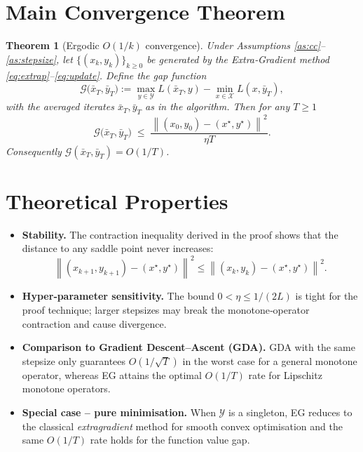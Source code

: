 \documentclass{article}
\newtheorem{theorem}{Theorem}
\newcommand{\norm}[1]{\left\|#1\right\|}
\begin{document}
\section*{Main Convergence Theorem}
\begin{theorem}[Ergodic $O(1/k)$ convergence]\label{thm:main}
Under Assumptions \ref{as:cc}–\ref{as:stepsize}, let $\{(x_k,y_k)\}_{k\ge0}$ be generated by the Extra‑Gradient method \eqref{eq:extrap}–\eqref{eq:update}. Define the \emph{gap function}
\[
\mathcal{G}\bigl(\bar x_T,\bar y_T\bigr):=
\max_{y\in\mathcal{Y}} L(\bar x_T,y)-\min_{x\in\mathcal{X}} L(x,\bar y_T),
\]
with the averaged iterates $\bar x_T,\bar y_T$ as in the algorithm. Then for any $T\ge1$
\[
\mathcal{G}\bigl(\bar x_T,\bar y_T\bigr)\;\le\;
\frac{\norm{(x_0,y_0)-(x^\star,y^\star)}^2}{\eta T}.
\]
Consequently $\mathcal{G}(\bar x_T,\bar y_T)=O(1/T)$.
\end{theorem}

\section*{Theoretical Properties}
\begin{itemize}[noitemsep,topsep=0pt]
\item \textbf{Stability.} The contraction inequality derived in the proof shows that the distance to any saddle point never increases:
\[
\norm{(x_{k+1},y_{k+1})-(x^\star,y^\star)}^2
\le \norm{(x_k,y_k)-(x^\star,y^\star)}^2.
\]
\item \textbf{Hyper‑parameter sensitivity.} The bound $0<\eta\le 1/(2L)$ is tight for the proof technique; larger stepsizes may break the monotone‑operator contraction and cause divergence.
\item \textbf{Comparison to Gradient Descent–Ascent (GDA).} GDA with the same stepsize only guarantees $O(1/\sqrt{T})$ in the worst case for a general monotone operator, whereas EG attains the optimal $O(1/T)$ rate for Lipschitz monotone operators.
\item \textbf{Special case – pure minimisation.} When $\mathcal{Y}$ is a singleton, EG reduces to the classical \emph{extragradient} method for smooth convex optimisation and the same $O(1/T)$ rate holds for the function value gap.
\end{itemize}

\end{document}
